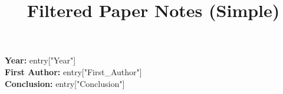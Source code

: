 \documentclass[11pt]{article}
\title{Filtered Paper Notes (Simple)}
\date{}
\begin{document}
\maketitle


\textbf{Year:} {{ entry["Year"] }} \\
\textbf{First Author:} {{ entry["First_Author"] }} \\
\textbf{Conclusion:} {{ entry["Conclusion"] }} \\

\vspace{1em}

\end{document}
